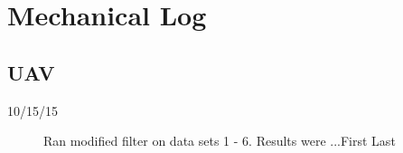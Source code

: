 \section{Mechanical Log}


\subsection{UAV}


\begin{description}
\item [10/15/15]  Ran modified filter on data sets 1 - 6.  Results were ...\hfill{First Last}


\end{description}
